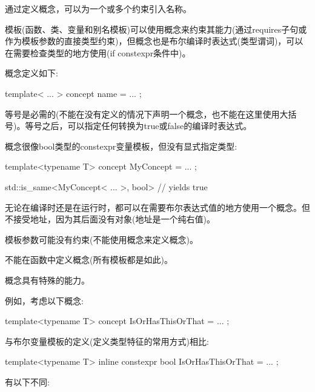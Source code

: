 
通过定义概念，可以为一个或多个约束引入名称。

模板(函数、类、变量和别名模板)可以使用概念来约束其能力(通过requires子句或作为模板参数的直接类型约束)，但概念也是布尔编译时表达式(类型谓词)，可以在需要检查类型的地方使用(if constexpr条件中)。


概念定义如下:

\begin{cpp}
template< ... >
concept name = ... ;
\end{cpp}

等号是必需的(不能在没有定义的情况下声明一个概念，也不能在这里使用大括号)。等号之后，可以指定任何转换为true或false的编译时表达式。

概念很像bool类型的constexpr变量模板，但没有显式指定类型:

\begin{cpp}
template<typename T>
concept MyConcept = ... ;

std::is_same<MyConcept< ... >, bool> // yields true
\end{cpp}

无论在编译时还是在运行时，都可以在需要布尔表达式值的地方使用一个概念。但不接受地址，因为其后面没有对象(地址是一个纯右值)。

模板参数可能没有约束(不能使用概念来定义概念)。

不能在函数中定义概念(所有模板都是如此)。


概念具有特殊的能力。

例如，考虑以下概念:

\begin{cpp}
template<typename T>
concept IsOrHasThisOrThat = ... ;
\end{cpp}

与布尔变量模板的定义(定义类型特征的常用方式)相比:

\begin{cpp}
template<typename T>
inline constexpr bool IsOrHasThisOrThat = ... ;
\end{cpp}

有以下不同:

